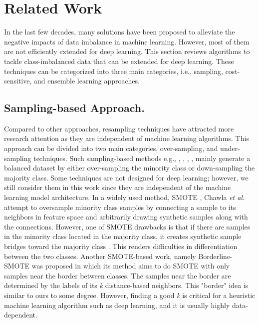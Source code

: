 
\section{Related Work}
\label{sec:relatedwork}


In the last few decades, many solutions have been proposed to alleviate the negative impacts of data imbalance in machine learning. However, most of them are not efficiently extended for deep learning. This section reviews algorithms to tackle class-imbalanced data that can be extended for deep learning. These techniques can be categorized into three main categories, i.e., sampling, cost-sensitive, and ensemble learning approaches. 

\subsection{Sampling-based Approach.}
Compared to other approaches, resampling techniques have attracted more research attention as they are independent of machine learning algorithms. This approach can be divided into two main categories, over-sampling, and under-sampling techniques. Such sampling-based methods e.g., \cite{DBLP:journals/corr/ShenLH15}, \cite{DBLP:journals/corr/abs-1711-00941}, \cite{haibo_he_learning_2009}, \cite{li_entropy-based_2020}, \cite{ertekin_active_2007} mainly generate a balanced dataset by either over-sampling the minority class or down-sampling the majority class. Some techniques are not designed for deep learning; however, we still consider them in this work since they are independent of the machine learning model architecture. In a widely used method, SMOTE \cite{chawla_smote:_2002}, Chawla \textit{et al.} attempt to oversample minority class samples by connecting a sample to its neighbors in feature space and arbitrarily drawing synthetic samples along with the connections. However, one of SMOTE drawbacks is that if there are samples in the minority class located in the majority class, it creates synthetic sample bridges toward the majority class \cite{goswami_class_2020}. This renders difficulties in differentiation between the two classes. Another SMOTE-based work, namely Borderline-SMOTE \cite{bordersmote} was proposed in which its method aims to do SMOTE with only samples near the border between classes. The samples near the border are determined by the labels of its \textit{k} distance-based neighbors. This "border" idea is similar to ours to some degree. However, finding a good \textit{k} is critical for a heuristic machine learning algorithm such as deep learning, and it is usually highly data-dependent. 

